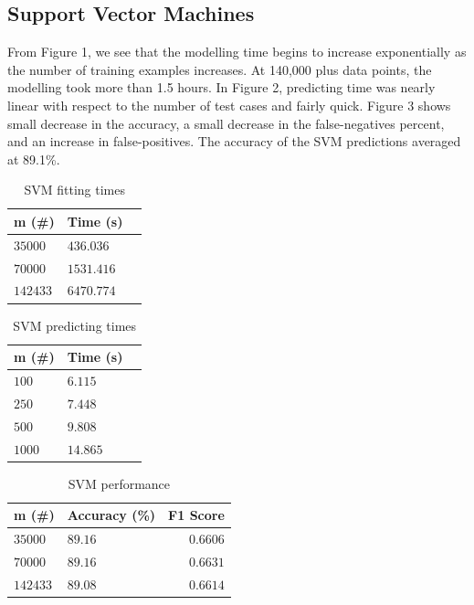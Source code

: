 \documentclass[twoside]{article}
\begin{document}
\begin{multicols}{2}
\subsection{Support Vector Machines}
From Figure 1, we see that the modelling time begins to increase exponentially as the number of training examples increases. At 140,000 plus data points, the modelling took more than 1.5 hours. In Figure 2, predicting time was nearly linear with respect to the number of test cases and fairly quick. Figure 3 shows small decrease in the accuracy, a small decrease in the false-negatives percent, and an increase in false-positives. The accuracy of the SVM predictions averaged at 89.1\%.

\begin{table}[H]
\caption{SVM fitting times}
\centering
\begin{tabular}{llr}
\toprule
m (\#) & Time (s) \\
\midrule
$35000$ & $436.036$ \\
$70000$ & $1531.416$ \\
$142433$ & $6470.774$ \\
\bottomrule
\end{tabular}
\end{table}

\begin{table}[H]
\caption{SVM predicting times}
\centering
\begin{tabular}{llr}
\toprule
m (\#) & Time (s) \\
\midrule
$100$ & $6.115$ \\
$250$ & $7.448$ \\
$500$ & $9.808$ \\
$1000$ & $14.865$ \\
\bottomrule
\end{tabular}
\end{table}

\begin{table}[H]
\caption{SVM performance}
\centering
\begin{tabular}{llr}
\toprule
m (\#) & Accuracy (\%) & F1 Score \\
\midrule
$35000$ & $89.16$ & $0.6606$ \\
$70000$ & $89.16$ & $0.6631$ \\
$142433$ & $89.08$ & $0.6614$ \\
\bottomrule
\end{tabular}
\end{table}


\end{multicols}
\end{document}
